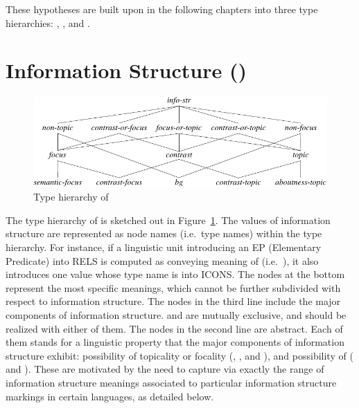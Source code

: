 \noindent These hypotheses are built upon in the following chapters
into three type hierarchies: , , and
.


\section{Information Structure \textnormal{(}\textnormal{)}}
\label{9:sec:info-str}



\begin{figure}[!t]
\begin{center} 
\includegraphics[width=\textwidth]{pdf/info-str.pdf}
\caption{Type hierarchy of }
\label{fig:info-str}
\end{center}
\end{figure}

\noindent The type hierarchy of  is sketched out in
Figure~\ref{fig:info-str}. The values of
information structure are represented as node names (i.e.\ type names)
within the  type hierarchy.  For instance, if a
linguistic unit introducing an EP (Elementary Predicate) into RELS is
computed as conveying meaning of 
(i.e.\ ), it also introduces one 
value whose type name is  into ICONS.
The nodes at the bottom represent the most specific meanings, which cannot be
further subdivided with respect to information structure. The nodes in
the third line include the major components of information
structure.  and  are mutually exclusive, and
 should be realized with either of them. The nodes in
the second line are abstract. Each of them stands for a linguistic
property that the major components of information structure exhibit:
possibility of topicality or focality (,
, and ), and possibility of
 ( and ).
These are motivated by the need to capture via
 exactly the range of information structure
meanings associated to particular information structure markings in
certain languages, as detailed below.




